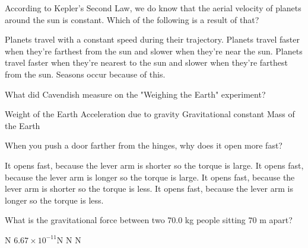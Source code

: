 \documentclass[13pt,addpoints]{exam}
\begin{document}
{{{\begin{questions}
\begin{choices}
					\end{choices}
					\question According to Kepler's Second Law, we do know that the aerial velocity of planets around the sun is constant. Which of the following is  a result of that?
					\begin{choices}
						\choice Planets travel with a constant speed during their trajectory.
						\choice Planets travel faster when they're farthest from the sun and slower when they're near the sun.
						\choice Planets travel faster when they're nearest to the sun and slower when they're farthest from the sun.
						\choice Seasons occur because of this.
					\end{choices}
					\question What did Cavendish measure on the "Weighing the Earth" experiment? \\
					\begin{oneparchoices}
						\choice Weight of the Earth
						\choice Acceleration due to gravity
						\choice Gravitational constant
						\choice Mass of the Earth
					\end{oneparchoices}
					\question When you push a door farther from the hinges, why does it open more fast?
					\begin{choices}
						\choice It opens fast, because the lever arm is shorter so
						the torque is large.
						\choice It opens fast, because the lever arm is longer so the
						torque is large.
						\choice It opens fast, because the lever arm is shorter so
						the torque is less.
						\choice It opens fast, because the lever arm is longer so
						the torque is less.
					\end{choices}
					\question What is the gravitational force between two 70.0 kg
					people sitting $70$ m apart? \\
					\begin{oneparchoices}
						\choice 1 N
						\choice $6.67\times10^{-11}$N
						\choice 70 N
						\choice 0 N
					\end{oneparchoices}

\end{questions}}}}
\end{document}
